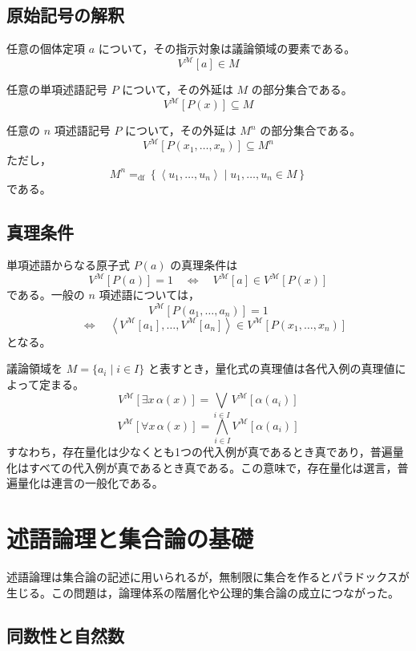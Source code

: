 \documentclass[../main.tex]{subfiles}
\begin{document}
\subsection{原始記号の解釈}

任意の個体定項 \(a\) について，その指示対象は議論領域の要素である。
\[
  V^{\mathcal{M}}[a] \in M
\]

任意の単項述語記号 \(P\) について，その外延は \(M\) の部分集合である。
\[
  V^{\mathcal{M}}[P(x)] \subseteq M
\]

任意の \(n\) 項述語記号 \(P\) について，その外延は \(M^n\) の部分集合である。
\[
  V^{\mathcal{M}}[P(x_1,\ldots,x_n)] \subseteq M^n
\]
ただし，
\[
  M^n
  =_{\mathrm{df}}
  \left\{
    \left\langle u_1,\ldots,u_n\right\rangle
    \mathrel{}
    \middle|
    \mathrel{}
    u_1,\ldots,u_n \in M
  \right\}
\]
である。

\subsection{真理条件}

単項述語からなる原子式 \(P(a)\) の真理条件は
\[
  V^{\mathcal{M}}[P(a)] = 1
  \quad\Longleftrightarrow\quad
  V^{\mathcal{M}}[a] \in V^{\mathcal{M}}[P(x)]
\]
である。一般の \(n\) 項述語については，
\[
  V^{\mathcal{M}}[P(a_1,\ldots,a_n)] = 1
\]
\[
  \quad\Longleftrightarrow\quad
  \left\langle
    V^{\mathcal{M}}[a_1],\ldots,V^{\mathcal{M}}[a_n]
  \right\rangle
  \in
  V^{\mathcal{M}}[P(x_1,\ldots,x_n)]
\]
となる。

議論領域を \(M=\{a_i\mid i\in I\}\) と表すとき，量化式の真理値は各代入例の真理値によって定まる。
\[
  V^{\mathcal{M}}[\exists x\,\alpha(x)]
  =
  \bigvee_{i\in I}V^{\mathcal{M}}[\alpha(a_i)]
\]
\[
  V^{\mathcal{M}}[\forall x\,\alpha(x)]
  =
  \bigwedge_{i\in I}V^{\mathcal{M}}[\alpha(a_i)]
\]
すなわち，存在量化は少なくとも1つの代入例が真であるとき真であり，普遍量化はすべての代入例が真であるとき真である。この意味で，存在量化は選言，普遍量化は連言の一般化である。

\section{述語論理と集合論の基礎}

述語論理は集合論の記述に用いられるが，無制限に集合を作るとパラドックスが生じる。この問題は，論理体系の階層化や公理的集合論の成立につながった。

\subsection{同数性と自然数}
\end{document}

